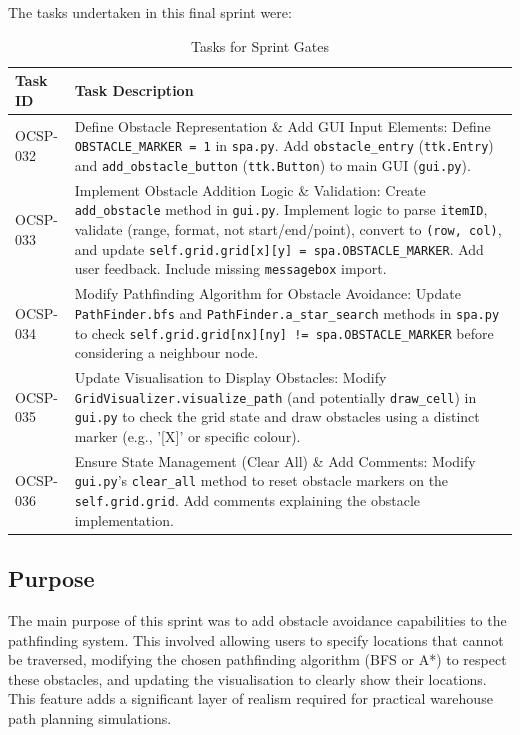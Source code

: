 The tasks undertaken in this final sprint were:
\begin{table}[htbp]
	\centering
	\begin{tabularx}{\textwidth}{|l|X|}
		\hline
		\textbf{Task ID} & \textbf{Task Description} \\
		\hline
		OCSP-032 & Define Obstacle Representation \& Add GUI Input Elements: Define \verb|OBSTACLE_MARKER = 1| in \verb|spa.py|. Add \verb|obstacle_entry| (\verb|ttk.Entry|) and \verb|add_obstacle_button| (\verb|ttk.Button|) to main GUI (\verb|gui.py|). \\
		\hline
		OCSP-033 & Implement Obstacle Addition Logic \& Validation: Create \verb|add_obstacle| method in \verb|gui.py|. Implement logic to parse \verb|itemID|, validate (range, format, not start/end/point), convert to \verb|(row, col)|, and update \verb|self.grid.grid[x][y] = spa.OBSTACLE_MARKER|. Add user feedback. Include missing \verb|messagebox| import. \\
		\hline
		OCSP-034 & Modify Pathfinding Algorithm for Obstacle Avoidance: Update \verb|PathFinder.bfs| and \verb|PathFinder.a_star_search| methods in \verb|spa.py| to check \verb|self.grid.grid[nx][ny] != spa.OBSTACLE_MARKER| before considering a neighbour node. \\
		\hline
		OCSP-035 & Update Visualisation to Display Obstacles: Modify \verb|GridVisualizer.visualize_path| (and potentially \verb|draw_cell|) in \verb|gui.py| to check the grid state and draw obstacles using a distinct marker (e.g., '[X]' or specific colour). \\
		\hline
		OCSP-036 & Ensure State Management (Clear All) \& Add Comments: Modify \verb|gui.py|'s \verb|clear_all| method to reset obstacle markers on the \verb|self.grid.grid|. Add comments explaining the obstacle implementation. \\
		\hline
	\end{tabularx}
	\caption{Tasks for Sprint Gates}
\end{table}

\subsection{Purpose}
The main purpose of this sprint was to add obstacle avoidance capabilities to the pathfinding system. This involved allowing users to specify locations that cannot be traversed, modifying the chosen pathfinding algorithm (BFS or A*) to respect these obstacles, and updating the visualisation to clearly show their locations. This feature adds a significant layer of realism required for practical warehouse path planning simulations.


